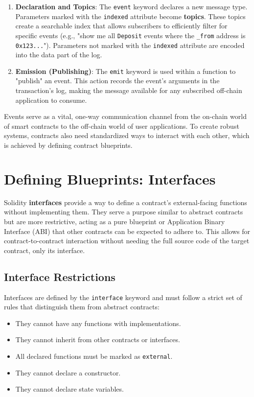 \documentclass{scrbook}
\begin{document}
\begin{enumerate}
    \item \textbf{Declaration and Topics}: The \texttt{event} keyword declares a new message type. Parameters marked with the \texttt{indexed} attribute become \textbf{topics}. These topics create a searchable index that allows subscribers to efficiently filter for specific events (e.g., "show me all \texttt{Deposit} events where the \texttt{\_from} address is \texttt{0x123...}"). Parameters not marked with the \texttt{indexed} attribute are encoded into the data part of the log.
    
    \item \textbf{Emission (Publishing)}: The \texttt{emit} keyword is used within a function to "publish" an event. This action records the event's arguments in the transaction's log, making the message available for any subscribed off-chain application to consume.
\end{enumerate}

Events serve as a vital, one-way communication channel from the on-chain world of smart contracts to the off-chain world of user applications. To create robust systems, contracts also need standardized ways to interact with each other, which is achieved by defining contract blueprints.

\chapter{Defining Blueprints: Interfaces}

Solidity \textbf{interfaces} provide a way to define a contract's external-facing functions without implementing them. They serve a purpose similar to abstract contracts but are more restrictive, acting as a pure blueprint or Application Binary Interface (ABI) that other contracts can be expected to adhere to. This allows for contract-to-contract interaction without needing the full source code of the target contract, only its interface.

\section{Interface Restrictions}

Interfaces are defined by the \texttt{interface} keyword and must follow a strict set of rules that distinguish them from abstract contracts:

\begin{itemize}
    \item They cannot have any functions with implementations.
    \item They cannot inherit from other contracts or interfaces.
    \item All declared functions must be marked as \texttt{external}.
    \item They cannot declare a constructor.
    \item They cannot declare state variables.
\end{itemize}
\end{document}
